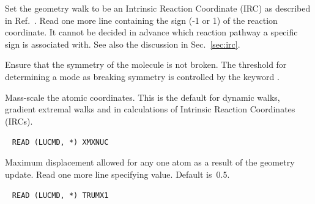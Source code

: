 \begin{description}
Set the geometry walk to be  an
Intrinsic Reaction Coordinate (IRC) as described in
Ref.~\cite{kfacr14}. Read one
more line containing the sign (-1 or 1) of the reaction coordinate. It
cannot be decided in advance which reaction pathway a specific sign is
associated with. See also the discussion in Sec.~\ref{sec:irc}.

%

\item[\Key{KEEPSY}] Ensure that the symmetry of the molecule is not
broken. The threshold for determining a mode as breaking symmetry is
controlled by the keyword .

\item[\Key{MASSES}] Mass-scale the atomic
coordinates.  This is the
default for dynamic walks, gradient
extremal walks and in calculations
of Intrinsic Reaction Coordinates
(IRCs).

\item[\Key{MAXNUC}]\verb| |\newline
\verb|READ (LUCMD, *) XMXNUC|

Maximum displacement allowed for any one
atom as a result of the geometry update.  Read one more line
specifying value.  Default is~0.5.

\item[\Key{MAXTRU}]\verb| |\newline
\verb|READ (LUCMD, *) TRUMX1|


\end{description}
